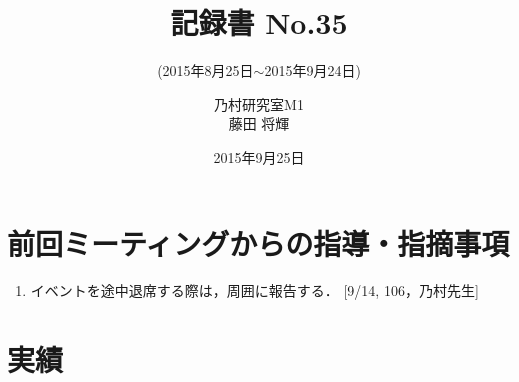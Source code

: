 \documentclass[fleqn, 14pt]{extarticle}
\subtitle{(2015年8月25日$\sim$2015年9月24日)}
\author{乃村研究室M1\\藤田 将輝}
\date{2015年9月25日}
\title{記録書 No.35}
\begin{document}
    \maketitle

    \section{前回ミーティングからの指導・指摘事項}
    \label{sec-1}
    \begin{enumerate}
        \item イベントを途中退席する際は，周囲に報告する．
            \hfill
            [9/14, 106，乃村先生]
            \newline

    \end{enumerate}

    \section{実績}
    \label{sec-2}
\end{document}
